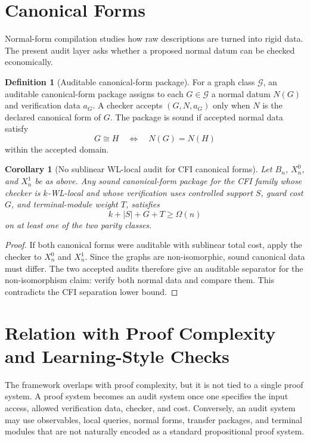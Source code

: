 \documentclass[11pt]{article}
\newtheorem{corollary}[theorem]{Corollary}
\theoremstyle{definition}
\newtheorem{definition}[theorem]{Definition}
\begin{document}
\section{Canonical Forms}

Normal-form compilation studies how raw descriptions are turned into rigid data. The present audit layer asks whether a proposed normal datum can be checked economically.

\begin{definition}[Auditable canonical-form package]
For a graph class \(\mathcal G\), an auditable canonical-form package assigns to each \(G\in\mathcal G\) a normal datum \(N(G)\) and verification data \(a_G\). A checker accepts \((G,N,a_G)\) only when \(N\) is the declared canonical form of \(G\). The package is sound if accepted normal data satisfy
\[
G\cong H
\quad\Longleftrightarrow\quad
N(G)=N(H)
\]
within the accepted domain.
\end{definition}

\begin{corollary}[No sublinear WL-local audit for CFI canonical forms]
Let \(B_n\), \(X_n^0\), and \(X_n^1\) be as above. Any sound canonical-form package for the CFI family whose checker is \(k\)-WL-local and whose verification uses controlled support \(S\), guard cost \(G\), and terminal-module weight \(T\), satisfies
\[
k+|S|+G+T\geq \Omega(n)
\]
on at least one of the two parity classes.
\end{corollary}

\begin{proof}
If both canonical forms were auditable with sublinear total cost, apply the checker to \(X_n^0\) and \(X_n^1\). Since the graphs are non-isomorphic, sound canonical data must differ. The two accepted audits therefore give an auditable separator for the non-isomorphism claim: verify both normal data and compare them. This contradicts the CFI separation lower bound.
\end{proof}

\section{Relation with Proof Complexity and Learning-Style Checks}

The framework overlaps with proof complexity, but it is not tied to a single proof system. A proof system becomes an audit system once one specifies the input access, allowed verification data, checker, and cost. Conversely, an audit system may use observables, local queries, normal forms, transfer packages, and terminal modules that are not naturally encoded as a standard propositional proof system.
\end{document}
